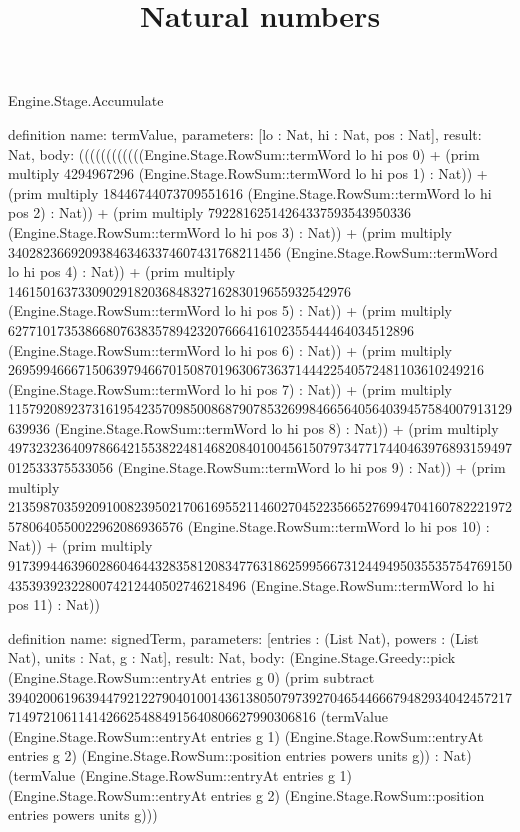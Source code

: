 \begin{lexlean}{Engine.Stage.Accumulate}
\title{Natural numbers}
\begin{semanticmodule}
definition{
  name: termValue,
  parameters: [lo : Nat, hi : Nat, pos : Nat],
  result: Nat,
  body: ((((((((((((Engine.Stage.RowSum::termWord lo hi pos 0) + (prim multiply 4294967296 (Engine.Stage.RowSum::termWord lo hi pos 1) : Nat)) + (prim multiply 18446744073709551616 (Engine.Stage.RowSum::termWord lo hi pos 2) : Nat)) + (prim multiply 79228162514264337593543950336 (Engine.Stage.RowSum::termWord lo hi pos 3) : Nat)) + (prim multiply 340282366920938463463374607431768211456 (Engine.Stage.RowSum::termWord lo hi pos 4) : Nat)) + (prim multiply 1461501637330902918203684832716283019655932542976 (Engine.Stage.RowSum::termWord lo hi pos 5) : Nat)) + (prim multiply 6277101735386680763835789423207666416102355444464034512896 (Engine.Stage.RowSum::termWord lo hi pos 6) : Nat)) + (prim multiply 26959946667150639794667015087019630673637144422540572481103610249216 (Engine.Stage.RowSum::termWord lo hi pos 7) : Nat)) + (prim multiply 115792089237316195423570985008687907853269984665640564039457584007913129639936 (Engine.Stage.RowSum::termWord lo hi pos 8) : Nat)) + (prim multiply 497323236409786642155382248146820840100456150797347717440463976893159497012533375533056 (Engine.Stage.RowSum::termWord lo hi pos 9) : Nat)) + (prim multiply 2135987035920910082395021706169552114602704522356652769947041607822219725780640550022962086936576 (Engine.Stage.RowSum::termWord lo hi pos 10) : Nat)) + (prim multiply 9173994463960286046443283581208347763186259956673124494950355357547691504353939232280074212440502746218496 (Engine.Stage.RowSum::termWord lo hi pos 11) : Nat))
}

definition{
  name: signedTerm,
  parameters: [entries : (List Nat), powers : (List Nat), units : Nat, g : Nat],
  result: Nat,
  body: (Engine.Stage.Greedy::pick (Engine.Stage.RowSum::entryAt entries g 0) (prim subtract 39402006196394479212279040100143613805079739270465446667948293404245721771497210611414266254884915640806627990306816 (termValue (Engine.Stage.RowSum::entryAt entries g 1) (Engine.Stage.RowSum::entryAt entries g 2) (Engine.Stage.RowSum::position entries powers units g)) : Nat) (termValue (Engine.Stage.RowSum::entryAt entries g 1) (Engine.Stage.RowSum::entryAt entries g 2) (Engine.Stage.RowSum::position entries powers units g)))
}


\end{semanticmodule}
\end{lexlean}

